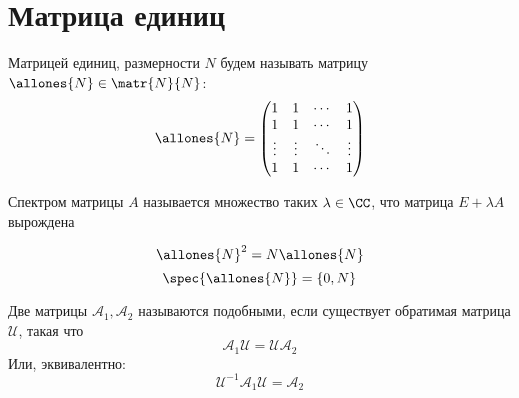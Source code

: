 \section{Матрица единиц}

Матрицей единиц, размерности \( N \) будем называть матрицу
\( \allones{N} \in \matr{N}{N} \):
\[
    \allones{N} =
    \begin{pmatrix}
    1 & 1  & \cdots & 1 \\
    1 & 1  & \cdots & 1 \\
    \vdots & \vdots & \ddots & \vdots \\
    1 & 1  & \cdots & 1
    \end{pmatrix}
\]

Спектром матрицы \( A \) называется множество таких \( \lambda\in\CC \),
что матрица \( E + \lambda A \) вырождена

\begin{propose}
\[
    \allones{N}^2 = N \allones{N}
    \]
\[
    \spec{\allones{N}} = \left\{ 0, N \right\}
    \]
\end{propose}

\begin{dfn}
    Две матрицы \( \mathcal A_1, \mathcal A_2 \)
    называются подобными, если существует обратимая матрица \( \mathcal U \),
    такая что
    \[
        \mathcal A_1 \mathcal U = \mathcal U \mathcal A_2
        \]
    Или, эквивалентно:
    \[
        \mathcal U^{-1} \mathcal A_1 \mathcal U = \mathcal A_2
        \]
\end{dfn}

